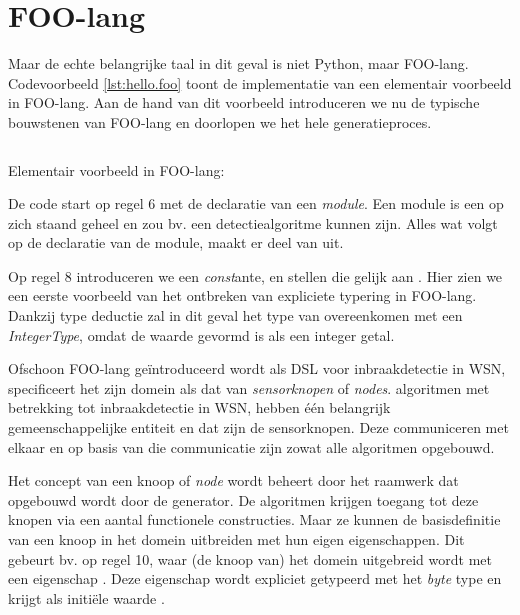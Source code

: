
\section{FOO-lang}
\label{section:devel-foo-lang}

Maar de echte belangrijke taal in dit geval is niet Python, maar FOO-lang.
Codevoorbeeld \ref{lst:hello.foo} toont de implementatie van een elementair voorbeeld
in FOO-lang. Aan de hand van dit voorbeeld introduceren we nu de typische
bouwstenen van FOO-lang en doorlopen we het hele generatieproces.

\begin{listing}[ht]
  \inputminted[linenos,frame=lines,framesep=2mm,fontsize=\footnotesize]{js}{../src/foo-lang/examples/hello.foo}
  \vspace{-3mm}
  \caption{Elementair voorbeeld in FOO-lang: }
  \label{lst:hello.foo}
\end{listing}

De code start op regel 6 met de declaratie van een \emph{module}. Een module is
een op zich staand geheel en zou bv. een detectiealgoritme kunnen zijn. Alles
wat volgt op de declaratie van de module, maakt er deel van uit.

Op regel 8 introduceren we een \emph{const}ante,  en stellen die
gelijk aan . Hier zien we een eerste voorbeeld van het ontbreken van
expliciete typering in FOO-lang. Dankzij type deductie zal in dit geval het
type van  overeenkomen met een \emph{IntegerType}, omdat de
waarde  gevormd is als een integer getal.

Ofschoon FOO-lang ge\"introduceerd wordt als DSL voor inbraakdetectie in WSN,
specificeert het zijn domein als dat van \emph{sensorknopen} of \emph{nodes}.
algoritmen met betrekking tot inbraakdetectie in WSN, hebben \'e\'en belangrijk
gemeenschappelijke entiteit en dat zijn de sensorknopen. Deze communiceren met
elkaar en op basis van die communicatie zijn zowat alle algoritmen opgebouwd.

Het concept van een knoop of \emph{node} wordt beheert door het raamwerk dat
opgebouwd wordt door de generator. De algoritmen krijgen toegang tot deze
knopen via een aantal functionele constructies. Maar ze kunnen de
basisdefinitie van een knoop in het domein uitbreiden met hun eigen
eigenschappen. Dit gebeurt bv. op regel 10, waar (de knoop van) het domein
uitgebreid wordt met een eigenschap . Deze eigenschap wordt
expliciet getypeerd met het \emph{byte} type en krijgt als initi\"ele waarde
.

